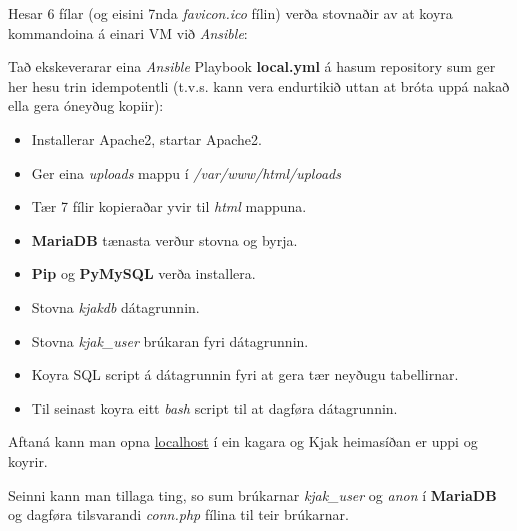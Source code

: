 \documentclass{article}
\begin{document}
\par Hesar 6 fílar (og eisini 7nda \textit{favicon.ico} fílin) verða stovnaðir
av at koyra kommandoina á einari VM við \textit{Ansible}:
\newline
\newline
{}
\newline
\par Tað ekskeverarar eina \textit{Ansible} Playbook \textbf{local.yml} á hasum
repository sum ger her hesu trin idempotentli (t.v.s. kann vera endurtikið uttan at
bróta uppá nakað ella gera óneyðug kopiir):
\begin{itemize}
    \item Installerar Apache2, startar Apache2.
    \item Ger eina \textit{uploads} mappu í \textit{/var/www/html/uploads}
    \item Tær 7 fílir kopieraðar yvir til \textit{html} mappuna.
    \item \textbf{MariaDB} tænasta verður stovna og byrja.
    \item \textbf{Pip} og \textbf{PyMySQL} verða installera.
    \item Stovna \textit{kjakdb} dátagrunnin.
    \item Stovna \textit{kjak\_user} brúkaran fyri dátagrunnin.
    \item Koyra SQL script á dátagrunnin fyri at gera tær neyðugu tabellirnar.
    \item Til seinast koyra eitt \textit{bash} script til at dagføra dátagrunnin.
\end{itemize}

 Aftaná kann man opna \underline{localhost} í ein kagara og Kjak heimasíðan er uppi
 og koyrir.

 \par Seinni kann man tillaga ting, so sum brúkarnar \textit{kjak\_user} og \textit{anon}
í \textbf{MariaDB} og dagføra tilsvarandi \textit{conn.php} fílina til teir brúkarnar.
\end{document}
